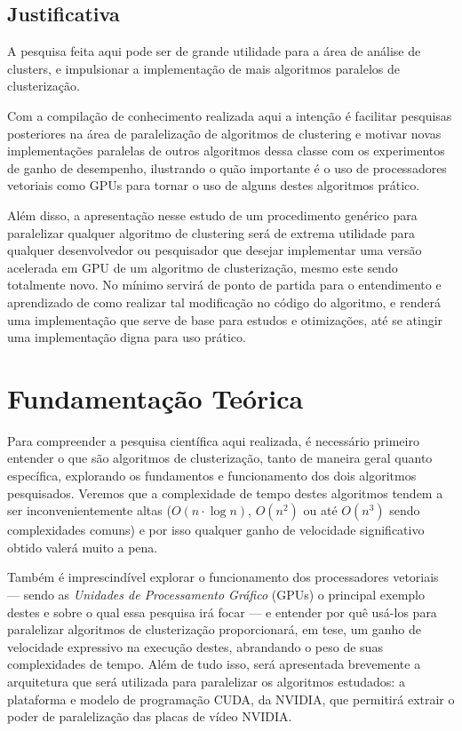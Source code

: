 \documentclass[12pt, %
openright, 
oneside, %
a4paper,    %
brazil]{facom-ufu-abntex2}
\def\qntAlgrtm{dois}
\begin{document}
\section{Justificativa}

A pesquisa feita aqui pode ser de grande utilidade para a área de análise de clusters, e impulsionar a implementação de mais algoritmos paralelos de clusterização.

Com a compilação de conhecimento realizada aqui a intenção é facilitar pesquisas posteriores na área de paralelização de algoritmos de clustering e motivar novas implementações paralelas de outros algoritmos dessa classe com os experimentos de ganho de desempenho, ilustrando o quão importante é o uso de processadores vetoriais como GPUs para tornar o uso de alguns destes algoritmos prático.

Além disso, a apresentação nesse estudo de um procedimento genérico para paralelizar qualquer algoritmo de clustering será de extrema utilidade para qualquer desenvolvedor ou pesquisador que desejar implementar uma versão acelerada em GPU de um algoritmo de clusterização, mesmo este sendo totalmente novo. No mínimo servirá de ponto de partida para o entendimento e aprendizado de como realizar tal modificação no código do algoritmo, e renderá uma implementação que serve de base para estudos e otimizações, até se atingir uma implementação digna para uso prático.




\chapter{Fundamentação Teórica}

Para compreender a pesquisa científica aqui realizada, é necessário primeiro entender o que são algoritmos de clusterização, tanto de maneira geral quanto específica, explorando os fundamentos e funcionamento dos \qntAlgrtm{} algoritmos pesquisados. Veremos que a complexidade de tempo destes algoritmos tendem a ser inconvenientemente altas ($O(n\cdot\log{n})$, $O(n^2)$ ou até $O(n^3)$ sendo complexidades comuns) e por isso qualquer ganho de velocidade significativo obtido valerá muito a pena.

Também é imprescindível explorar o funcionamento dos processadores vetoriais --- sendo as \textit{Unidades de Processamento Gráfico} (GPUs) o principal exemplo destes e sobre o qual essa pesquisa irá focar --- e entender por quê usá-los para paralelizar algoritmos de clusterização proporcionará, em tese, um ganho de velocidade expressivo na execução destes, abrandando o peso de suas complexidades de tempo. Além de tudo isso, será apresentada brevemente a arquitetura que será utilizada para paralelizar os algoritmos estudados: a plataforma e modelo de programação CUDA, da NVIDIA, que permitirá extrair o poder de paralelização das placas de vídeo NVIDIA.
\end{document}
